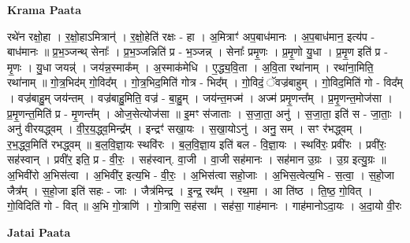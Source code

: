 \documentclass[17pt]{extarticle}
\begin{document}
\textbf{Krama Paata} \newline

रथे॑न रक्षो॒हा । र॒क्षो॒हाऽमित्रान्॑ । र॒क्षो॒हेति॑ रक्षः - हा । अ॒मित्राꣳ॑ अप॒बाध॑मानः । अ॒प॒बाध॑मान॒ इत्य॑प - बाध॑मानः ॥ प्र॒भ॒ञ्जन्थ् सेनाः᳚ । प्र॒भ॒ञ्जन्निति॑ प्र - भ॒ञ्जन्न् । सेनाः᳚ प्रमृ॒णः । प्र॒मृ॒णो यु॒धा । प्र॒मृ॒ण इति॑ प्र - मृ॒णः । यु॒धा जयन्न्॑ । जय॑न्न॒स्माक᳚म् । अ॒स्माक॑मेधि । ए॒द्ध्य॒वि॒ता । अ॒वि॒ता रथा॑नाम् । रथा॑ना॒मिति॒ रथा॑नाम् ॥ गो॒त्र॒भिद॑म् गो॒विद᳚म् । गो॒त्र॒भिद॒मिति॑ गोत्र - भिद᳚म् । गो॒विदं॒ ॅवज्र॑बाहुम् । गो॒विद॒मिति॑ गो - विद᳚म् । वज्र॑बाहु॒म् जय॑न्तम् । वज्र॑बाहु॒मिति॒ वज्र॑ - बा॒हु॒म् । जय॑न्त॒मज्म॑ । अज्म॑ प्रमृ॒णन्त᳚म् । प्र॒मृ॒णन्त॒मोज॑सा । प्र॒मृ॒णन्त॒मिति॑ प्र - मृ॒णन्त᳚म् । ओज॒सेत्योज॑सा ॥ इ॒मꣳ स॑जाताः । स॒जा॒ता॒ अनु॑ । स॒जा॒ता॒ इति॑ स - जा॒ताः॒ । अनु॑ वीरयद्ध्वम् । वी॒र॒य॒द्ध्व॒मिन्द्र᳚म् । इन्द्रꣳ॑ सखा॒यः । स॒खा॒योऽनु॑ । अनु॒ सम् । सꣳ र॑भद्ध्वम् । र॒भ॒द्ध्व॒मिति॑ रभद्ध्वम् ॥ ब॒ल॒वि॒ज्ञा॒यः स्थवि॑रः । ब॒ल॒वि॒ज्ञा॒य इति॑ बल - वि॒ज्ञा॒यः । स्थवि॑रः॒ प्रवी॑रः । प्रवी॑रः॒ सह॑स्वान् । प्रवी॑र॒ इति॒ प्र - वी॒रः॒ । सह॑स्वान्. वा॒जी । वा॒जी सह॑मानः । सह॑मान उ॒ग्रः । उ॒ग्र इत्यु॒ग्रः ॥ अ॒भिवी॑रो अ॒भिस॑त्वा । अ॒भिवी॑र॒ इत्य॒भि - वी॒रः॒ । अ॒भिस॑त्वा सहो॒जाः । अ॒भिस॒त्वेत्य॒भि - स॒त्वा॒ । स॒हो॒जा जैत्र᳚म् । स॒हो॒जा इति॑ सहः - जाः । जैत्र॑मिन्द्र । इ॒न्द्र॒ रथ᳚म् । रथ॒मा । आ ति॑ष्ठ । ति॒ष्ठ॒ गो॒वित् । गो॒विदिति॑ गो - वित् ॥ अ॒भि गो॒त्राणि॑ । गो॒त्राणि॒ सह॑सा । सह॑सा॒ गाह॑मानः । गाह॑मानोऽदा॒यः । अ॒दा॒यो वी॒रः \newline

\textbf{Jatai Paata} \newline
\end{document}
